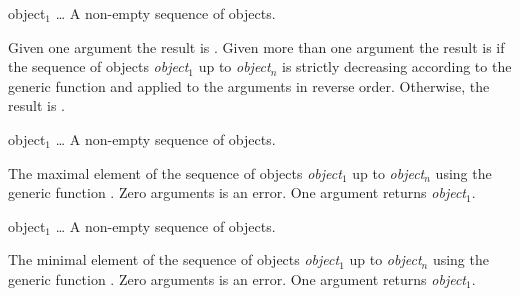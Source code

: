 \begin{optDefinition}
\function{>=}
%
\begin{arguments}
    \item[object$_1$ \ldots] A non-empty sequence of objects.
\end{arguments}
%
\result%
Given one argument the result is \true{}.  Given more than one argument the
result is \true{} if the sequence of objects {\em object$_1$} up to {\em
    object$_n$} is strictly decreasing according to the generic function
 and  applied to the arguments in
reverse order.  Otherwise, the result is \nil{}.

%
\begin{arguments}
    \item[object$_1$ \ldots] A non-empty sequence of objects.
\end{arguments}
%
\result%
The maximal element of the sequence of objects {\em object$_1$} up to {\em
    object$_n$} using the generic function .  Zero arguments
is an error.  One argument returns {\em object$_1$}.

%
\begin{arguments}
    \item[object$_1$ \ldots] A non-empty sequence of objects.
\end{arguments}
%
\result%
The minimal element of the sequence of objects {\em object$_1$} up to {\em
    object$_n$} using the generic function .  Zero arguments
is an error.  One argument returns {\em object$_1$}.
%
\end{optDefinition}
